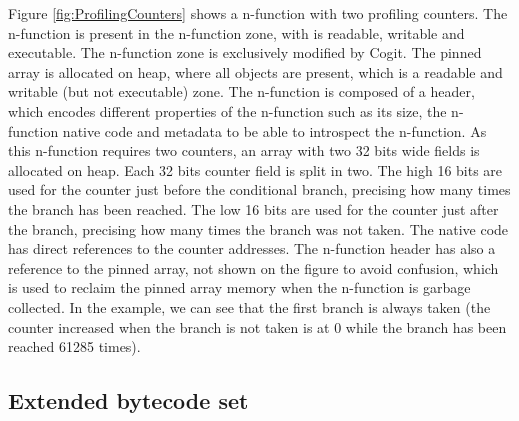 \documentclass[a4paper,12pt,twoside]{../includes/ThesisStyle}
\begin{document}
Figure \ref{fig:ProfilingCounters} shows a n-function with two profiling counters. The n-function is present in the n-function zone, with is readable, writable and executable. The n-function zone is exclusively modified by Cogit. The pinned array is allocated on heap, where all objects are present, which is a readable and writable (but not executable) zone. The n-function is composed of a header, which encodes different properties of the n-function such as its size, the n-function native code and metadata to be able to introspect the n-function. As this n-function requires two counters, an array with two 32 bits wide fields is allocated on heap. Each 32 bits counter field is split in two. The high 16 bits are used for the counter just before the conditional branch, precising how many times the branch has been reached. The low 16 bits are used for the counter just after the branch, precising how many times the branch was not taken. The native code has direct references to the counter addresses. The n-function header has also a reference to the pinned array, not shown on the figure to avoid confusion, which is used to reclaim the pinned array memory when the n-function is garbage collected. In the example, we can see that the first branch is always taken (the counter increased when the branch is not taken is at 0 while the branch has been reached 61285 times).

\subsection{Extended bytecode set}
\end{document}
